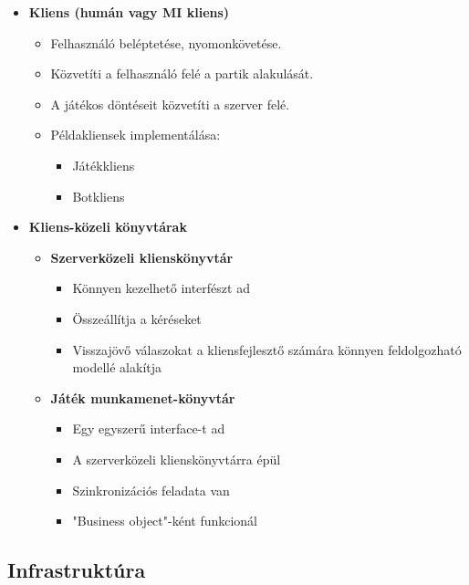 \documentclass[twoside, a4paper, 12pt]{article}
\begin{document}
\begin{itemize}
\begin{itemize}
		\item \textbf{Kliens (humán vagy MI kliens)}
		\begin{itemize}
			\item Felhasználó beléptetése, nyomonkövetése.
			\item Közvetíti a felhasználó felé a partik alakulását.
			\item A játékos döntéseit közvetíti a szerver felé.
			\item Példakliensek implementálása:
			\begin{itemize}
				\item Játékkliens
				\item Botkliens
			\end{itemize}
		\end{itemize}
	\item \textbf{Kliens-közeli könyvtárak}
	\begin{itemize}
		\item \textbf{Szerverközeli klienskönyvtár}
		\begin{itemize}
			\item Könnyen kezelhető interfészt ad
			\item Összeállítja a kéréseket
			\item Visszajövő válaszokat a kliensfejlesztő számára könnyen feldolgozható modellé alakítja
		\end{itemize}
		\item \textbf{Játék munkamenet-könyvtár}
		\begin{itemize}
			\item Egy egyszerű interface-t ad
			\item A szerverközeli klienskönyvtárra épül
			\item Szinkronizációs feladata van
			\item "Business object"-ként funkcionál
		\end{itemize}
	\end{itemize}
	\end{itemize}
\end{itemize}











\subsection{Infrastruktúra}
\end{document}
